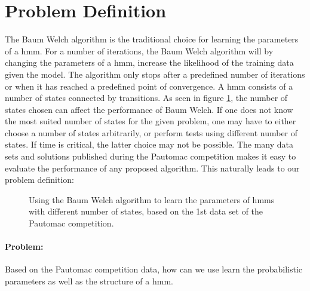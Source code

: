 \section{Problem Definition}

The Baum Welch algorithm is the traditional choice for learning the parameters of a \gls{hmm}\cite{pautomacTR}. 
For a number of iterations, the Baum Welch algorithm will by changing the parameters of a \gls{hmm}, increase the likelihood of the training data given the model. The algorithm only stops after a predefined number of iterations or when it has reached a predefined point of convergence.
A \gls{hmm} consists of a number of states connected by transitions. As seen in figure \ref{fig:bw-states-are-important}, the number of states chosen can affect the performance of Baum Welch. If one does not know the most suited number of states for the given problem, one may have to either choose a number of states arbitrarily, or perform tests using different number of states. If time is critical, the latter choice may not be possible.
The many data sets and solutions published during the Pautomac competition makes it easy to evaluate the performance of any proposed algorithm.
This naturally leads to our problem definition:

\begin{figure}
\begin{centering}
\caption{Using the Baum Welch algorithm to learn the parameters of \gls{hmm}s with different number of states, based on the 1st data set of the Pautomac competition.}
\label{fig:bw-states-are-important} 
\end{centering}
\end{figure}


\paragraph{Problem:}

Based on the Pautomac competition data, how can we use learn the probabilistic parameters as well as the structure of a \gls{hmm}.